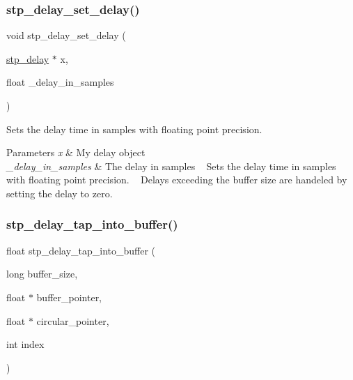 \subsubsection{\texorpdfstring{stp\+\_\+delay\+\_\+set\+\_\+delay()}{stp\_delay\_set\_delay()}}
{\footnotesize\ttfamily void stp\+\_\+delay\+\_\+set\+\_\+delay (\begin{DoxyParamCaption}\item[{\hyperlink{structstp__delay}{stp\+\_\+delay} $\ast$}]{x,  }\item[{float}]{\+\_\+delay\+\_\+in\+\_\+samples }\end{DoxyParamCaption})\hspace{0.3cm}{\ttfamily [related]}}



Sets the delay time in samples with floating point precision. ~\newline
 


\begin{DoxyParams}{Parameters}
{\em x} & My delay object ~\newline
 \\
\hline
{\em \+\_\+delay\+\_\+in\+\_\+samples} & The delay in samples ~\newline
 Sets the delay time in samples with floating point precision. ~\newline
 Delays exceeding the buffer size are handeled by setting the delay to zero. ~\newline
 \\
\hline
\end{DoxyParams}
\mbox{\label{structstp__delay_a26d9061428adafc706946d8c63452f84}} 
\subsubsection{\texorpdfstring{stp\+\_\+delay\+\_\+tap\+\_\+into\+\_\+buffer()}{stp\_delay\_tap\_into\_buffer()}}
{\footnotesize\ttfamily float stp\+\_\+delay\+\_\+tap\+\_\+into\+\_\+buffer (\begin{DoxyParamCaption}\item[{long}]{buffer\+\_\+size,  }\item[{float $\ast$}]{buffer\+\_\+pointer,  }\item[{float $\ast$}]{circular\+\_\+pointer,  }\item[{int}]{index }\end{DoxyParamCaption})\hspace{0.3cm}{\ttfamily [related]}}




